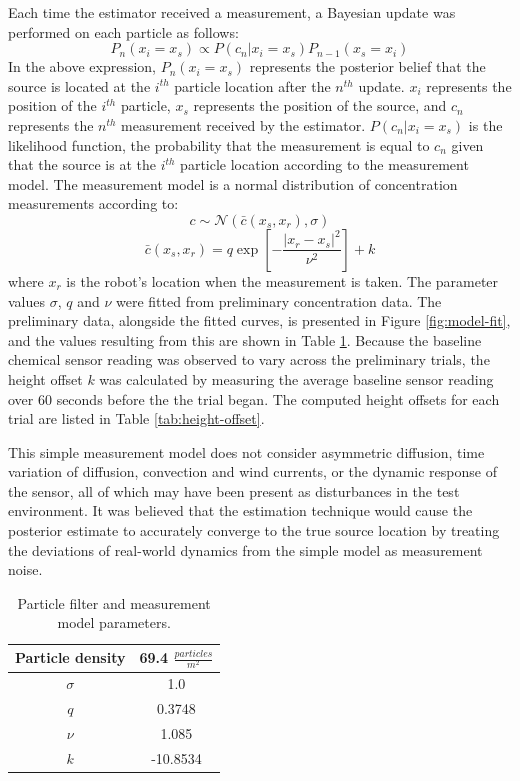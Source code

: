 \documentclass[submit, 12pt]{aiaa-pretty-modified}
\begin{document}
Each time the estimator received a
measurement, a Bayesian update was performed on each particle
as follows: 
\[P_n(x_i = x_s) \propto P(c_n | x_i = x_s) P_{n-1}(x_s = x_i)\]
In the above expression, $P_n(x_i = x_s)$ represents the posterior belief that the source is located at the
$i^{th}$ particle location after the $n^{th}$ update.  $x_i$
represents the position of the $i^{th}$ particle, $x_s$ represents the
position of the source, and $c_n$ represents
the $n^{th}$ measurement received by the estimator. $P(c_n | x_i =
x_s)$ is the likelihood function, the probability that the measurement
is equal to $c_n$ given that the source is at the $i^{th}$ particle location according to
the measurement model. The measurement model is a normal
distribution of concentration
measurements according to: 
\[c \sim \mathcal{N}\left(\bar{c}(x_s,x_r), \sigma \right)\]
\[\bar{c}(x_s,x_r) = q \exp{\left[-\frac{|x_r - x_s|^2}{\nu^2}\right]} + k\]
where $x_r$ is the robot's location when the measurement is taken. The parameter
values $\sigma$, $q$ and $\nu$ were fitted from preliminary concentration data.
The preliminary data, alongside the fitted curves, is presented in Figure
\ref{fig:model-fit}, and the values resulting from this are shown in Table
\ref{tab:estimator-parameters}. Because the baseline chemical sensor reading was
observed to vary across the preliminary trials, the height offset $k$ was
calculated by measuring the average baseline sensor reading over 60 seconds
before the the trial began. The computed height offsets for each trial are listed in Table \ref{tab:height-offset}. 

This simple measurement model does not consider
asymmetric diffusion, time variation of diffusion, convection and wind currents,
or the dynamic response of the sensor, all of which may have been present as
disturbances in the test environment. It was believed that the estimation
technique would cause the posterior estimate to accurately converge to the true
source location by treating the deviations of real-world dynamics from the
simple model as measurement noise.

\begin{table}
\caption[Estimator parameters]{Particle filter and measurement model parameters.}
\begin{center}
\begin{tabular}{|c|c|}
\hline
Particle density & 69.4 $\frac{particles}{m^2}$ \\ \hline
$\sigma$ & 1.0 \\ \hline
$q$ & 0.3748 \\ \hline
$\nu$ & 1.085  \\ \hline
$k$ & -10.8534  \\ \hline
\end{tabular}
\end{center}
\label{tab:estimator-parameters}
\end{table}
\end{document}
